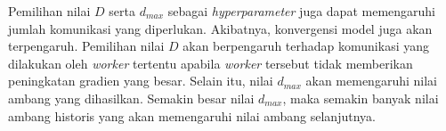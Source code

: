 Pemilihan nilai $D$ serta $d_{max}$ sebagai \emph{hyperparameter} juga dapat memengaruhi jumlah komunikasi yang diperlukan. Akibatnya, konvergensi model juga akan terpengaruh. Pemilihan nilai $D$ akan berpengaruh terhadap komunikasi yang dilakukan oleh \emph{worker} tertentu apabila \emph{worker} tersebut tidak memberikan peningkatan gradien yang besar. Selain itu, nilai $d_{max}$ akan memengaruhi nilai ambang yang dihasilkan. Semakin besar nilai $d_{max}$, maka semakin banyak nilai ambang historis yang akan memengaruhi nilai ambang selanjutnya.
